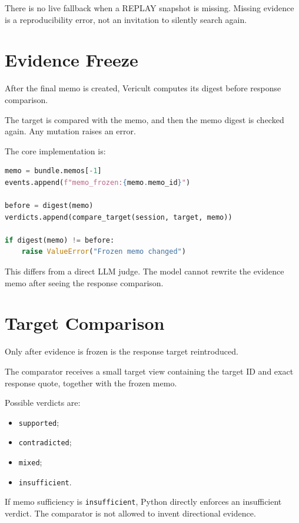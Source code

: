 There is no live fallback when a REPLAY snapshot is missing. Missing evidence is a reproducibility error, not an invitation to silently search again.

\section{Evidence Freeze}

After the final memo is created, Vericult computes its digest before response comparison.

The target is compared with the memo, and then the memo digest is checked again. Any mutation raises an error.

The core implementation is:

\begin{lstlisting}[language=Python,caption={Evidence freeze in src/cultverify/pipeline.py.}]
memo = bundle.memos[-1]
events.append(f"memo_frozen:{memo.memo_id}")

before = digest(memo)
verdicts.append(compare_target(session, target, memo))

if digest(memo) != before:
    raise ValueError("Frozen memo changed")
\end{lstlisting}

This differs from a direct LLM judge. The model cannot rewrite the evidence memo after seeing the response comparison.

\section{Target Comparison}

Only after evidence is frozen is the response target reintroduced.

The comparator receives a small target view containing the target ID and exact response quote, together with the frozen memo.

Possible verdicts are:

\begin{itemize}
\item \texttt{supported};
\item \texttt{contradicted};
\item \texttt{mixed};
\item \texttt{insufficient}.
\end{itemize}

If memo sufficiency is \texttt{insufficient}, Python directly enforces an insufficient verdict. The comparator is not allowed to invent directional evidence.

